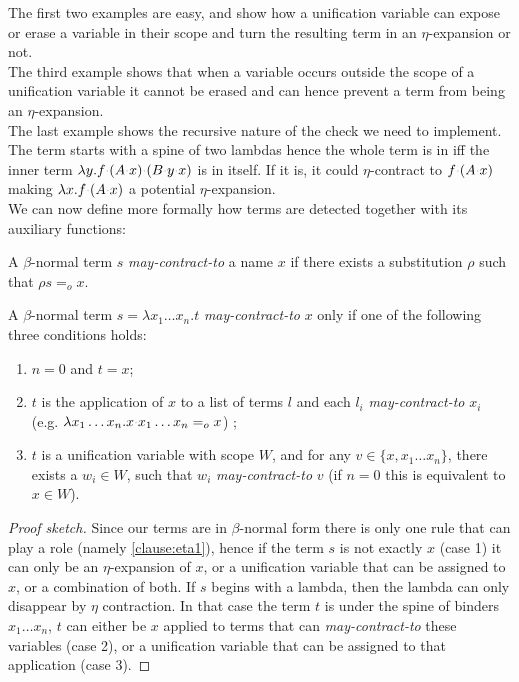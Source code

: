 \documentclass[sigconf,natbib=false,review]{acmart}
\newcommand{\appsep}{\ensuremath{\textcolor{lightgray}{\cdot}}}
\newcommand{\EqualRel}{\ensuremath{=}}
\newcommand{\Eo}{\ensuremath{\EqualRel_o}\xspace}
\begin{document}
\noindent
The first two examples are easy, and show how a unification variable can expose
or erase a variable in their scope and turn the resulting term in an $\eta$-expansion or not.\\
The third example shows that when a variable occurs outside the scope of a unification
variable it cannot be erased and can hence prevent a term from being an $\eta$-expansion.\\
The last example shows the recursive nature of the check we need to implement.
The term starts with a spine of two lambdas hence the whole term
is in \maybeeta iff the inner term $\lambda y.f\appsep (A \appsep x) \appsep (B \appsep y \appsep x)$
is in \maybeeta itself. If it is, it could $\eta$-contract to
$f \appsep (A \appsep x)$ making $\lambda x.f \appsep (A \appsep x)$ a potential
$\eta$-expansion.\\
We can now define more formally how \maybeeta terms are detected together with
its auxiliary functions:

\newcommand{\reduceto}{\emph{may-contract-to}}
\begin{definition}[\reduceto]
  A $\beta$-normal term $s$ \reduceto{} a name $x$ if there exists a
  substitution $\rho$ such that $\rho s \Eo{} x$.
\end{definition}

\begin{lemma}\label{lem:reduceto}
A $\beta$-normal term $s = \lambda x_1 \ldots x_n.t$
\reduceto{} $x$ only if one of the following three conditions holds:
\begin{enumerate}
  \item $n = 0$ and $t = x$;
  \item $t$ is the application of $x$ to a list
     of terms $l$ and each $l_i$ \reduceto{} $x_i$
     (e.g. $\lambda x_1 \ldots x_n.x \appsep x_1 \ldots x_n \Eo{} x$) ;
  \item $t$ is a unification variable with scope
    $W$, and for any $v \in \{ x, x_1 \ldots x_n \}$,
    there exists a $w_i \in W$, such that $w_i$ \reduceto{} $v$
    (if $n = 0$ this is equivalent to $x \in W$).
\end{enumerate}
\end{lemma}
\begin{proof}[Proof sketch]
Since our terms are in $\beta$-normal form there is only
one rule that can play a role (namely \ref{clause:eta1}),
hence if the term $s$ is not exactly $x$ (case 1)
it can only be an $\eta$-expansion of $x$, or a unification
variable that can be assigned to $x$, or a combination of both.
If $s$ begins with a lambda, then the lambda can only disappear by $\eta$
contraction. In that case the term $t$ is under the spine of binders
$x_1\ldots x_n$, $t$ can either be $x$ applied to terms that can
\reduceto{} these variables (case 2), or a unification variable
that can be assigned to that application (case 3).
\end{proof}
\end{document}
